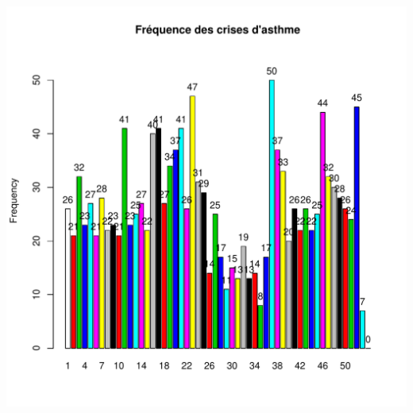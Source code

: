 \documentclass[12pt,english,french,twoside]{book}\usepackage[]{graphicx}\usepackage[]{color}
\makeatletter
\def\maxwidth{ %
  \ifdim\Gin@nat@width>\linewidth
    \linewidth
  \else
    \Gin@nat@width
  \fi
}
\makeatother
\begin{document}
\includegraphics[width=\maxwidth]{figure/asthme2-2} 
\end{document}
